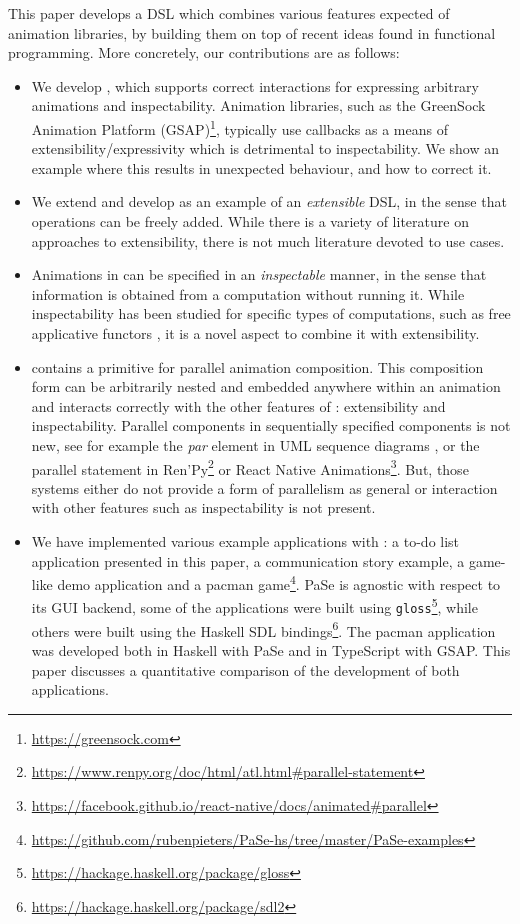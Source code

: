 This paper develops a DSL which combines various features expected of animation libraries, by building them on top of recent ideas found in functional programming. More concretely, our contributions are as follows:
\begin{itemize}
\item We develop \dsl{}, which supports correct interactions for expressing arbitrary animations and inspectability. Animation libraries, such as the GreenSock Animation Platform (GSAP)\footnote{\url{https://greensock.com}}, typically use callbacks as a means of extensibility/expressivity which is detrimental to inspectability. We show an example where this results in unexpected behaviour, and how to correct it.
\item We extend and develop \dsl{} as an example of an \emph{extensible} DSL, in the sense that operations can be freely added. While there is a variety of literature on approaches to extensibility, there is not much literature devoted to use cases.
\item Animations in \dsl{} can be specified in an \emph{inspectable} manner, in the sense that information is obtained from a computation without running it. While inspectability has been studied for specific types of computations, such as free applicative functors \cite{DBLP:journals/corr/CapriottiK14}, it is a novel aspect to combine it with extensibility.
\item \dsl{} contains a primitive for parallel animation composition. This composition form can be arbitrarily nested and embedded anywhere within an animation and interacts correctly with the other features of \dsl{}: extensibility and inspectability. Parallel components in sequentially specified components is not new, see for example the \emph{par} element in UML sequence diagrams \cite{umlspec}, or the parallel statement in Ren'Py\footnote{\url{https://www.renpy.org/doc/html/atl.html\#parallel-statement}} or React Native Animations\footnote{\url{https://facebook.github.io/react-native/docs/animated\#parallel}}. But, those systems either do not provide a form of parallelism as general or interaction with other features such as inspectability is not present.
\item We have implemented various example applications with \dsl{}: a to-do list application presented in this paper, a communication story example, a game-like demo application and a pacman game\footnote{\url{https://github.com/rubenpieters/PaSe-hs/tree/master/PaSe-examples}}. PaSe is agnostic with respect to its GUI backend, some of the applications were built using \texttt{gloss}\footnote{\url{https://hackage.haskell.org/package/gloss}}, while others were built using the Haskell SDL bindings\footnote{\url{https://hackage.haskell.org/package/sdl2}}. The pacman application was developed both in Haskell with PaSe and in TypeScript with GSAP. This paper discusses a quantitative comparison of the development of both applications.
\end{itemize}
